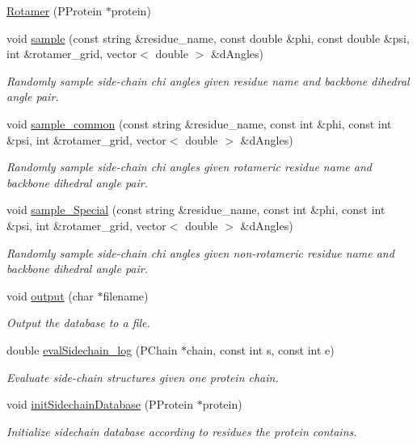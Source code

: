 \begin{DoxyCompactItemize}
\item 
\hyperlink{classRotamer_a9646e84497feedfb6a09ff9937cb4313}{Rotamer} (P\-Protein $\ast$protein)
\item 
void \hyperlink{classRotamer_a2938ad7d918e69f6f71f3a42a3019b35}{sample} (const string \&residue\-\_\-name, const double \&phi, const double \&psi, int \&rotamer\-\_\-grid, vector$<$ double $>$ \&d\-Angles)
\begin{DoxyCompactList}\small\item\em Randomly sample side-\/chain chi angles given residue name and backbone dihedral angle pair. \end{DoxyCompactList}\item 
void \hyperlink{classRotamer_aa58ff58cc11cfe9a68376e5b99ae3b51}{sample\-\_\-common} (const string \&residue\-\_\-name, const int \&phi, const int \&psi, int \&rotamer\-\_\-grid, vector$<$ double $>$ \&d\-Angles)
\begin{DoxyCompactList}\small\item\em Randomly sample side-\/chain chi angles given rotameric residue name and backbone dihedral angle pair. \end{DoxyCompactList}\item 
void \hyperlink{classRotamer_a062044d5ca99c307fb6be2369ed200bf}{sample\-\_\-\-Special} (const string \&residue\-\_\-name, const int \&phi, const int \&psi, int \&rotamer\-\_\-grid, vector$<$ double $>$ \&d\-Angles)
\begin{DoxyCompactList}\small\item\em Randomly sample side-\/chain chi angles given non-\/rotameric residue name and backbone dihedral angle pair. \end{DoxyCompactList}\item 
void \hyperlink{classRotamer_a9714326d4ad191c22e4672a6e5e8355d}{output} (char $\ast$filename)
\begin{DoxyCompactList}\small\item\em Output the database to a file. \end{DoxyCompactList}\item 
double \hyperlink{classRotamer_a813f284c56b83a9fe8d33ac82707954a}{eval\-Sidechain\-\_\-log} (P\-Chain $\ast$chain, const int s, const int e)
\begin{DoxyCompactList}\small\item\em Evaluate side-\/chain structures given one protein chain. \end{DoxyCompactList}\item 
void \hyperlink{classRotamer_a0b585070951b6afb654f41703a5bf695}{init\-Sidechain\-Database} (P\-Protein $\ast$protein)
\begin{DoxyCompactList}\small\item\em Initialize sidechain database according to residues the protein contains. \end{DoxyCompactList}\end{DoxyCompactItemize}
